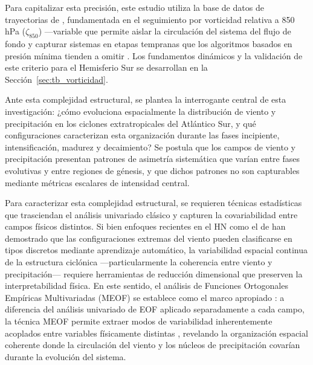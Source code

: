 Para capitalizar esta precisión, este estudio utiliza la base de datos de trayectorias de \citet{coutodesouza2024new}, fundamentada en el seguimiento por vorticidad relativa a 850 hPa ($\zeta_{850}$) —variable que permite aislar la circulación del sistema del flujo de fondo y capturar sistemas en etapas tempranas que los algoritmos basados en presión mínima tienden a omitir \citep{sinclair1994objective,sinclair1997objective}. Los fundamentos dinámicos y la validación de este criterio para el Hemisferio Sur se desarrollan en la Sección~\ref{sec:tb_vorticidad}.


Ante esta complejidad estructural, se plantea la interrogante central de esta investigación: ¿cómo evoluciona espacialmente la distribución de viento y precipitación en los ciclones extratropicales del Atlántico Sur, y qué configuraciones caracterizan esta organización durante las fases incipiente, intensificación, madurez y decaimiento? Se postula que los campos de viento y precipitación presentan patrones de asimetría sistemática que varían entre fases evolutivas y entre regiones de génesis, y que dichos patrones no son capturables mediante métricas escalares de intensidad central.

\label{subsec:intro_estrategia_estadistica}%
Para caracterizar esta complejidad estructural, se requieren técnicas estadísticas que trasciendan el análisis univariado clásico y capturen la covariabilidad entre campos físicos distintos. Si bien enfoques recientes en el HN como el de \citet{eisenstein2023identification} han demostrado que las configuraciones extremas del viento pueden clasificarse en tipos discretos mediante aprendizaje automático, la variabilidad espacial continua de la estructura ciclónica —particularmente la coherencia entre viento y precipitación— requiere herramientas de reducción dimensional que preserven la interpretabilidad física. En este sentido, el análisis de Funciones Ortogonales Empíricas Multivariadas (MEOF) se establece como el marco apropiado \citep{hannachi2007empirical}: a diferencia del análisis univariado de EOF aplicado separadamente a cada campo, la técnica MEOF permite extraer modos de variabilidad inherentemente acoplados entre variables físicamente distintas \citep{liang2018multivariate}, revelando la organización espacial coherente donde la circulación del viento y los núcleos de precipitación covarían durante la evolución del sistema. 

